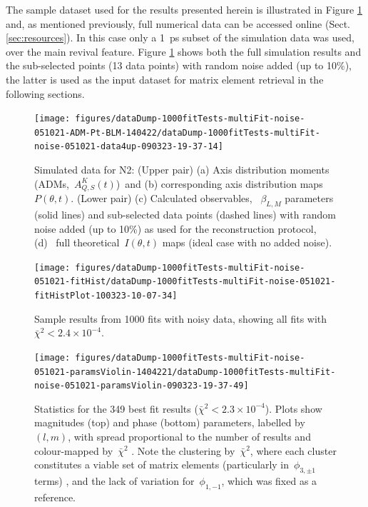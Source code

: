 \documentclass[10pt]{article}
\begin{document}
The sample dataset used for the results presented herein is illustrated in Figure \ref{720080} and, as mentioned previously, full numerical data can be accessed online (Sect. \ref{sec:resources}). In this case only a 1~ps subset of the simulation data was used, over the main revival feature. Figure \ref{720080} shows both the full simulation results and the sub-selected points (13 data points) with random noise added (up to 10\%), the latter is used as the input dataset for matrix element retrieval in the following sections. %
\begin{figure}[H]
\begin{center}
\texttt{[image: figures/dataDump-1000fitTests-multiFit-noise-051021-ADM-Pt-BLM-140422/dataDump-1000fitTests-multiFit-noise-051021-data4up-090323-19-37-14]}
\caption{{Simulated data for N2: (Upper pair) (a) Axis distribution moments
(ADMs,~\(A^{K}_{Q,S}(t)\))~and (b) corresponding axis distribution
maps~\(P(\theta, t)\). (Lower pair) (c) Calculated observables,
~\(\beta_{L,M}\) parameters (solid lines) and sub-selected data
points (dashed lines) with random noise added (up to 10\%) as used for
the reconstruction protocol, (d)~ full theoretical~\(I(\theta,t)\)
maps (ideal case with no added noise).
{\label{720080}}%
}}
\end{center}
\end{figure}
\begin{figure}[H]
\begin{center}
\texttt{[image: figures/dataDump-1000fitTests-multiFit-noise-051021-fitHist/dataDump-1000fitTests-multiFit-noise-051021-fitHistPlot-100323-10-07-34]}
\caption{{Sample results from 1000 fits with noisy data, showing all fits with
\(\bar{\chi}^2 < 2.4\times10^{-4}\).
{\label{509194}}%
}}
\end{center}
\end{figure}
\begin{figure}[H]
\begin{center}
\texttt{[image: figures/dataDump-1000fitTests-multiFit-noise-051021-paramsViolin-1404221/dataDump-1000fitTests-multiFit-noise-051021-paramsViolin-090323-19-37-49]}
\caption{{Statistics for the 349 best fit results (\(\bar{\chi}^2 < 2.3 \times 10^{-4}\)). Plots show
magnitudes (top) and phase (bottom) parameters, labelled
by~\((l,m)\), with spread proportional to the number of results
and colour-mapped by~\(\bar{\chi}^2\) . Note the clustering
by~\(\bar{\chi}^2\), where each cluster constitutes a viable set of
matrix elements (particularly in~\(\phi_{3,\pm1}\) terms) , and the
lack of variation for~\(\phi_{1,-1}\), which was fixed as a
reference.
{\label{494229}}%
}}
\end{center}
\end{figure}
\end{document}
